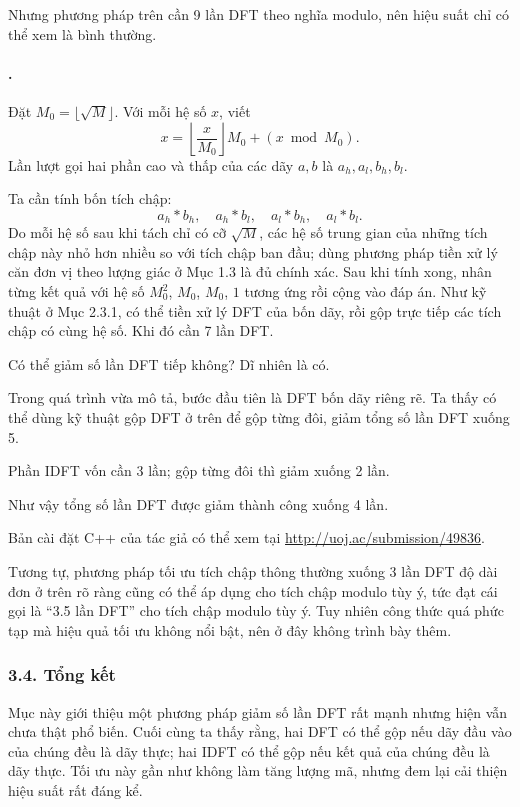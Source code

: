 \documentclass[11pt]{article}
\begin{document}
Nhưng phương pháp trên cần 9 lần DFT theo nghĩa modulo, nên hiệu suất chỉ có
thể xem là bình thường.

\paragraph{.}
Đặt \(M_0=\lfloor\sqrt M\rfloor\). Với mỗi hệ số \(x\), viết
\[
  x=\left\lfloor\frac{x}{M_0}\right\rfloor M_0+(x\bmod M_0).
\]
Lần lượt gọi hai phần cao và thấp của các dãy \(a,b\) là
\(a_h,a_l,b_h,b_l\).

Ta cần tính bốn tích chập:
\[
  a_h*b_h,\quad a_h*b_l,\quad a_l*b_h,\quad a_l*b_l.
\]
Do mỗi hệ số sau khi tách chỉ có cỡ \(\sqrt M\), các hệ số trung gian của
những tích chập này nhỏ hơn nhiều so với tích chập ban đầu; dùng phương pháp
tiền xử lý căn đơn vị theo lượng giác ở Mục 1.3 là đủ chính xác. Sau khi tính
xong, nhân từng kết quả với hệ số \(M_0^2\), \(M_0\), \(M_0\), \(1\) tương ứng
rồi cộng vào đáp án. Như kỹ thuật ở Mục 2.3.1, có thể tiền xử lý DFT của bốn
dãy, rồi gộp trực tiếp các tích chập có cùng hệ số. Khi đó cần 7 lần DFT.

Có thể giảm số lần DFT tiếp không? Dĩ nhiên là có.

Trong quá trình vừa mô tả, bước đầu tiên là DFT bốn dãy riêng rẽ. Ta thấy có
thể dùng kỹ thuật gộp DFT ở trên để gộp từng đôi, giảm tổng số lần DFT xuống
5.

Phần IDFT vốn cần 3 lần; gộp từng đôi thì giảm xuống 2 lần.

Như vậy tổng số lần DFT được giảm thành công xuống 4 lần.

Bản cài đặt C++ của tác giả có thể xem tại
\href{http://uoj.ac/submission/49836}{http://uoj.ac/submission/49836}.

Tương tự, phương pháp tối ưu tích chập thông thường xuống 3 lần DFT độ dài đơn
ở trên rõ ràng cũng có thể áp dụng cho tích chập modulo tùy ý, tức đạt cái
gọi là ``3.5 lần DFT'' cho tích chập modulo tùy ý. Tuy nhiên công thức quá
phức tạp mà hiệu quả tối ưu không nổi bật, nên ở đây không trình bày thêm.

\subsubsection*{3.4. Tổng kết}

Mục này giới thiệu một phương pháp giảm số lần DFT rất mạnh nhưng hiện vẫn
chưa thật phổ biến. Cuối cùng ta thấy rằng, hai DFT có thể gộp nếu dãy đầu
vào của chúng đều là dãy thực; hai IDFT có thể gộp nếu kết quả của chúng đều
là dãy thực. Tối ưu này gần như không làm tăng lượng mã, nhưng đem lại cải
thiện hiệu suất rất đáng kể.
\end{document}
